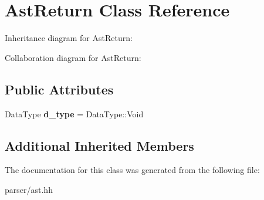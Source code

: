 \hypertarget{classAstReturn}{}\section{Ast\+Return Class Reference}
\label{classAstReturn}


Inheritance diagram for Ast\+Return\+:


Collaboration diagram for Ast\+Return\+:
\subsection*{Public Attributes}
\begin{DoxyCompactItemize}
\item 
\mbox{\label{classAstReturn_a8204ced49059e91975470f85b0b71057}} 
Data\+Type {\bfseries d\+\_\+type} = Data\+Type\+::\+Void
\end{DoxyCompactItemize}
\subsection*{Additional Inherited Members}


The documentation for this class was generated from the following file\+:\begin{DoxyCompactItemize}
\item 
parser/ast.\+hh\end{DoxyCompactItemize}
